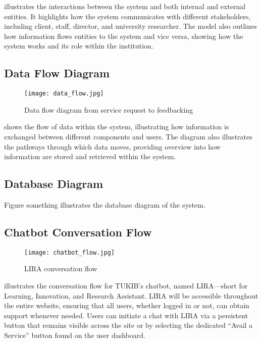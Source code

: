  illustrates the interactions between the system and both internal and external entities. It highlights how the system communicates with different stakeholders, including client, staff, director, and university researcher. The model also outlines how information flows entities to the system and vice versa, showing how the system works and its role within the institution.

\subsection{Data Flow Diagram}

\begin{figure}[h]
	\centering 
	\texttt{[image: data\_flow.jpg]}
	\caption{Data flow diagram from service request to feedbacking}
	\label{fig:data_flow}
\end{figure}

 shows the flow of data within the system, illustrating how information is exchanged between different components and users. The diagram also illustrates the pathways through which data moves, providing overview into how information are stored and retrieved within the system.

\subsection{Database Diagram}

Figure something illustrates the database diagram of the system.

\subsection{Chatbot Conversation Flow}

\begin{figure}[h]
	\centering 
	\texttt{[image: chatbot\_flow.jpg]}
	\caption{LIRA conversation flow}
	\label{fig:chatbot_flow}
\end{figure}

 illustrates the conversation flow for TUKIB's chatbot, named LIRA—short for Learning, Innovation, and Research Assistant. LIRA will be accessible throughout the entire website, ensuring that all users, whether logged in or not, can obtain support whenever needed. Users can initiate a chat with LIRA via a persistent button that remains visible across the site or by selecting the dedicated “Avail a Service” button found on the user dashboard.

